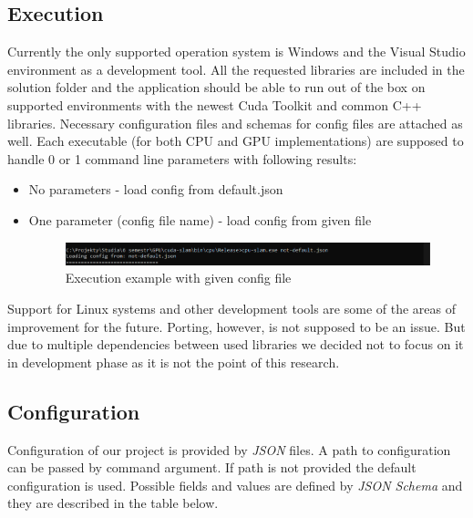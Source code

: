 \documentclass[titlepage]{article}
\begin{document}
\subsection{Execution}
Currently the only supported operation system is Windows and the Visual Studio environment as a development tool. All the requested libraries are included in the solution folder and the application should be able to run out of the box on supported environments with the newest Cuda Toolkit and common C++ libraries. Necessary configuration files and schemas for config files are attached as well. Each executable (for both CPU and GPU implementations) are supposed to handle 0 or 1 command line parameters with following results:
\begin{itemize}
\item No parameters - load config from default.json
\item One parameter (config file name) - load config from given file
\begin{figure}[H]
\includegraphics[width=\textwidth]{ss-exec.png}
\caption{Execution example with given config file}
\end{figure}
\end{itemize} 

Support for Linux systems and other development tools are some of the areas of improvement for the future. Porting, however, is not supposed to be an issue. But due to multiple dependencies between used libraries we decided not to focus on it in development phase as it is not the point of this research.

\subsection{Configuration}
Configuration of our project is provided by \textit{JSON} files. A path to configuration can be passed by command argument. If path is not provided the default configuration is used. Possible fields and values are defined by \textit{JSON Schema} and they are described in the table below.
\end{document}
